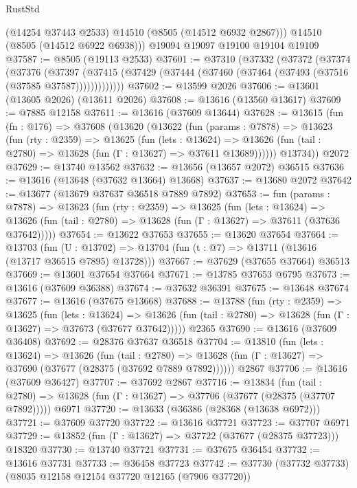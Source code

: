 \begin{lexlean}{RustStd}
\begin{coremodule}
        (@14254 @37443 @2533)
        @14510
        (@8505 (@14512 @6932 @2867)))
      @14510
      (@8505 (@14512 @6922 @6938)))
    @19094
    @19097
    @19100
    @19104
    @19109
@37587 := @8505 (@19113 @2533)
@37601 := @37310
    (@37332
      (@37372
        (@37374
          (@37376
            (@37397
              (@37415 (@37429 (@37444 (@37460 (@37464 (@37493 (@37516 (@37585 @37587)))))))))))))
@37602 := @13599 @2026
@37606 := @13601 (@13605 @2026) (@13611 @2026)
@37608 := @13616 (@13560 @13617)
@37609 := @7885 @12158
@37611 := @13616 (@37609 @13644)
@37628 := @13615
    (fun (fn : @176) =>
    @37608
      (@13620
        (@13622
          (fun (params : @7878) =>
          @13623
            (fun (rty : @2359) =>
            @13625
              (fun (lets : @13624) =>
              @13626 (fun (tail : @2780) => @13628 (fun (Γ : @13627) => @37611 @13689))))))
        @13734))
    @2072
@37629 := @13740 @13562
@37632 := @13656 (@13657 @2072) @36515
@37636 := @13616 (@13648 (@37632 @13664) @13668)
@37637 := @13680 @2072
@37642 := @13677 (@13679 @37637 @36518 @7889 @7892)
@37653 := fun (params : @7878) =>
  @13623
    (fun (rty : @2359) =>
    @13625
      (fun (lets : @13624) =>
      @13626 (fun (tail : @2780) => @13628 (fun (Γ : @13627) => @37611 (@37636 @37642)))))
@37654 := @13622 @37653
@37655 := @13620 @37654
@37664 := @13703
    (fun (U : @13702) => @13704 (fun (t : @7) => @13711 (@13616 (@13717 @36515 @7895) @13728)))
@37667 := @37629 (@37655 @37664) @36513
@37669 := @13601 @37654 @37664
@37671 := @13785 @37653 @6795
@37673 := @13616 (@37609 @36388)
@37674 := @37632 @36391
@37675 := @13648 @37674
@37677 := @13616 (@37675 @13668)
@37688 := @13788
    (fun (rty : @2359) =>
    @13625
      (fun (lets : @13624) =>
      @13626 (fun (tail : @2780) => @13628 (fun (Γ : @13627) => @37673 (@37677 @37642)))))
    @2365
@37690 := @13616 (@37609 @36408)
@37692 := @28376 @37637 @36518
@37704 := @13810
    (fun (lets : @13624) =>
    @13626
      (fun (tail : @2780) =>
      @13628 (fun (Γ : @13627) => @37690 (@37677 (@28375 (@37692 @7889 @7892))))))
    @2867
@37706 := @13616 (@37609 @36427)
@37707 := @37692 @2867
@37716 := @13834
    (fun (tail : @2780) => @13628 (fun (Γ : @13627) => @37706 (@37677 (@28375 (@37707 @7892)))))
    @6971
@37720 := @13633 (@36386 (@28368 (@13638 @6972)))
@37721 := @37609 @37720
@37722 := @13616 @37721
@37723 := @37707 @6971
@37729 := @13852 (fun (Γ : @13627) => @37722 (@37677 (@28375 @37723))) @18320
@37730 := @13740 @37721
@37731 := @37675 @36454
@37732 := @13616 @37731
@37733 := @36458 @37723
@37742 := @37730 (@37732 @37733) (@8035 @12158 @12154 @37720 @12165 (@7906 @37720))

\end{coremodule}
\end{lexlean}
